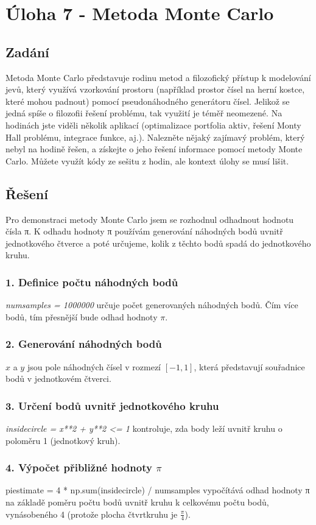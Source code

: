 \documentclass[a4paper,12pt]{article}
\begin{document}
	\section {Úloha 7 - Metoda Monte Carlo}
	\subsection{Zadání}
Metoda Monte Carlo představuje rodinu metod a filozofický přístup k modelování jevů, který využívá vzorkování prostoru (například prostor čísel na herní kostce, které mohou padnout) pomocí pseudonáhodného generátoru čísel. Jelikož se jedná spíše o filozofii řešení problému, tak využití je téměř neomezené. Na hodinách jste viděli několik aplikací (optimalizace portfolia aktiv, řešení Monty Hall problému, integrace funkce, aj.). Nalezněte nějaký zajímavý problém, který nebyl na hodině řešen, a získejte o jeho řešení informace pomocí metody Monte Carlo. Můžete využít kódy ze sešitu z hodin, ale kontext úlohy se musí lišit. 

\subsection{Řešení}
Pro demonstraci metody Monte Carlo jsem se rozhodnul odhadnout hodnotu čísla π. K odhadu hodnoty π používám generování náhodných bodů uvnitř jednotkového čtverce a poté určujeme, kolik z těchto bodů spadá do jednotkového kruhu.
\subsubsection{1. Definice počtu náhodných bodů}
\textit{num{\textunderscore}samples = 1000000} určuje počet generovaných náhodných bodů. Čím více bodů, tím přesnější bude odhad hodnoty $\pi$.
\subsubsection{2. Generování náhodných bodů}
$x$ a $y$ jsou pole náhodných čísel v rozmezí $[-1, 1]$, která představují souřadnice bodů v jednotkovém čtverci.
\subsubsection{3. Určení bodů uvnitř jednotkového kruhu}
\textit{inside{\textunderscore}circle = x**2 + y**2 <= 1} kontroluje, zda body leží uvnitř kruhu o poloměru 1 (jednotkový kruh).
\subsubsection{4. Výpočet přibližné hodnoty $\pi$}
pi{\textunderscore}estimate = 4 * np.sum(inside{\textunderscore}circle) / num{\textunderscore}samples vypočítává odhad hodnoty π na základě poměru počtu bodů uvnitř kruhu k celkovému počtu bodů, vynásobeného 4 (protože plocha čtvrtkruhu je $\frac{\pi}{4}$).

	
\end{document}
